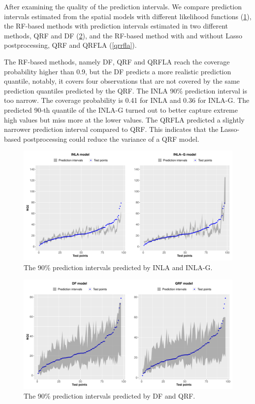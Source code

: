 \documentclass{article}
\begin{document}
After examining the quality of the prediction intervals. We compare prediction intervals estimated from the spatial models with different likelihood functions (\cref{inlapred}), the RF-based methods with prediction intervals estimated in two different methods, QRF and DF (\cref{distvsquant}), and the RF-based method with and without Lasso postprocessing, QRF and QRFLA (\cref{qrrfla}).  
 

The RF-based methods, namely DF, QRF and QRFLA reach the coverage probability higher than 0.9, but the DF predicts a more realistic prediction quantile, notably, it covers four observations that are not covered by the same prediction quantiles predicted by the QRF. The INLA 90\% prediction interval is too narrow. The coverage probability is 0.41 for INLA and 0.36 for INLA-G. The predicted 90-th quantile of the INLA-G turned out to better capture extreme high values but miss more at the lower values. The QRFLA predicted a slightly narrower prediction interval compared to QRF. This indicates that the Lasso-based postprocessing could reduce the variance of a QRF model.  


\begin{figure}[!htb]
\centering
\includegraphics[scale = 0.42]{fig/plot_inla.pdf}
\caption{The 90\% prediction intervals predicted by INLA and INLA-G. }
\label{inlapred}
\end{figure}

\label{sec:predinterval}
\begin{figure}[!htb]
\centering
\includegraphics[scale = 0.42]{fig/plot_ml_1.pdf}
\caption{The 90\% prediction intervals predicted by DF and QRF. }
\label{distvsquant}
\end{figure}
\end{document}
